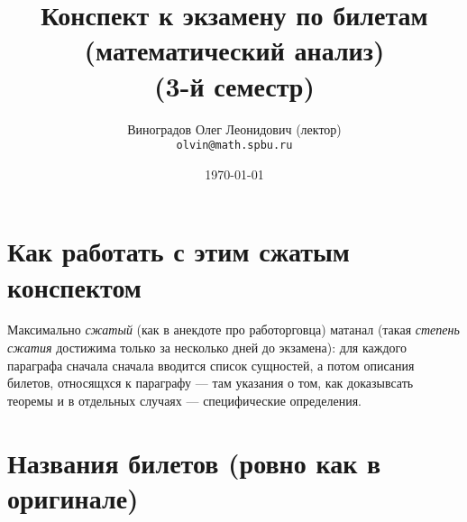 \documentclass[12pt, a4paper, oneside]{memoir}
\title{Конспект к экзамену по билетам (математический анализ) \\(3-й семестр)}
\author{
  \vova
  \and
  Виноградов Олег Леонидович (лектор)\\
  \texttt{olvin@math.spbu.ru}
}
\date{\today}
\begin{document}
\maketitle
\newpage
\tableofcontents
\newpage


\section{Как работать с этим сжатым конспектом}


Максимально \textit{сжатый} (как в анекдоте про работорговца) матанал (такая \textit{степень сжатия} достижима только за несколько дней до экзамена): 
для каждого параграфа сначала сначала вводится список сущностей, 
а потом описания билетов, относящхся к параграфу — 
там указания о том, как доказывсать теоремы и в отдельных случаях — специфические определения.

\section{Названия билетов (ровно как в оригинале)}
\end{document}
